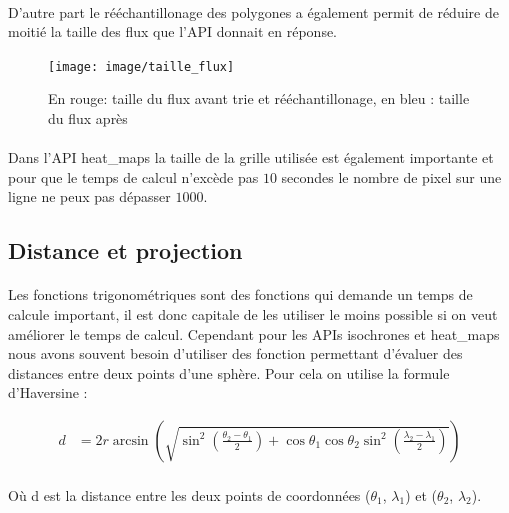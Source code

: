 \documentclass[a4paper]{report}
\begin{document}
\paragraph{} D'autre part le rééchantillonage des polygones a également permit de réduire de moitié la taille des flux que l'API donnait en réponse.

\begin{figure}[H]
	\begin{center}
		\texttt{[image: image/taille\_flux]}
		\caption{En rouge: taille du flux avant trie et rééchantillonage, en bleu : taille du flux après}
		\label{Taille du flux après tri et rééchantillonnage}
	\end{center}
\end{figure}

\paragraph{} Dans l'API heat\_maps la taille de la grille utilisée est également importante et pour que le temps de calcul n'excède pas $10$ secondes le nombre de pixel sur une ligne ne peux pas dépasser $1000$.

\subsection{Distance et projection}

\paragraph{} Les fonctions trigonométriques sont des fonctions qui demande un temps de calcule important, il est donc capitale de les utiliser le moins possible si on veut améliorer le temps de calcul. Cependant pour les APIs isochrones et heat\_maps nous avons souvent besoin d'utiliser des fonction permettant d'évaluer des distances entre deux points d'une sphère. Pour cela on utilise la formule d'Haversine :

\begin{align}
	d &= 2r\arcsin\left(\sqrt{\sin^2\left(\frac{\theta_{2} - \theta_{1}}{2}\right)+\cos\theta_{1}\cos\theta_{2}\sin^2\left(\frac{\lambda_{2} - \lambda_{1}}{2}\right)}\right)
\end{align}

\paragraph{} Où d est la distance entre les deux points de coordonnées ($\theta_{1}$, $\lambda_{1}$) et ($\theta_{2}$, $\lambda_{2}$).
\end{document}
